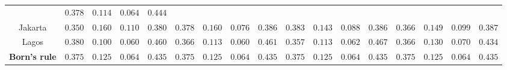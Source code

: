 \begin{landscape}
\begin{tabular}{c|cccc|cccc|cccc|cccc}
                & $\scriptstyle0.378$ & $\scriptstyle0.114$ & $\scriptstyle0.064$ & $\scriptstyle0.444$\\
Jakarta         & $\scriptstyle0.350$ & $\scriptstyle0.160$ & $\scriptstyle0.110$ & $\scriptstyle0.380$ 
                & $\scriptstyle0.378$ & $\scriptstyle0.160$ & $\scriptstyle0.076$ & $\scriptstyle0.386$ 
                & $\scriptstyle0.383$ & $\scriptstyle0.143$ & $\scriptstyle0.088$ & $\scriptstyle0.386$
                & $\scriptstyle0.366$ & $\scriptstyle0.149$ & $\scriptstyle0.099$ & $\scriptstyle0.387$\\   
Lagos           & $\scriptstyle0.380$ & $\scriptstyle0.100$ & $\scriptstyle0.060$ & $\scriptstyle0.460$ 
                & $\scriptstyle0.366$ & $\scriptstyle0.113$ & $\scriptstyle0.060$ & $\scriptstyle0.461$ 
                & $\scriptstyle0.357$ & $\scriptstyle0.113$ & $\scriptstyle0.062$ & $\scriptstyle0.467$
                & $\scriptstyle0.366$ & $\scriptstyle0.130$ & $\scriptstyle0.070$ & $\scriptstyle0.434$\\
\midrule
\textbf{Born's rule}    & $\scriptstyle0.375$ & $\scriptstyle0.125$ & $\scriptstyle0.064$ & $\scriptstyle0.435$ 
                        & $\scriptstyle0.375$ & $\scriptstyle0.125$ & $\scriptstyle0.064$ & $\scriptstyle0.435$ 
                        & $\scriptstyle0.375$ & $\scriptstyle0.125$ & $\scriptstyle0.064$ & $\scriptstyle0.435$ 
                        & $\scriptstyle0.375$ & $\scriptstyle0.125$ & $\scriptstyle0.064$ & $\scriptstyle0.435$ \\
\bottomrule        
\end{tabular}
\label{table:quantum_results}
\vspace*{\fill}
\end{landscape}


